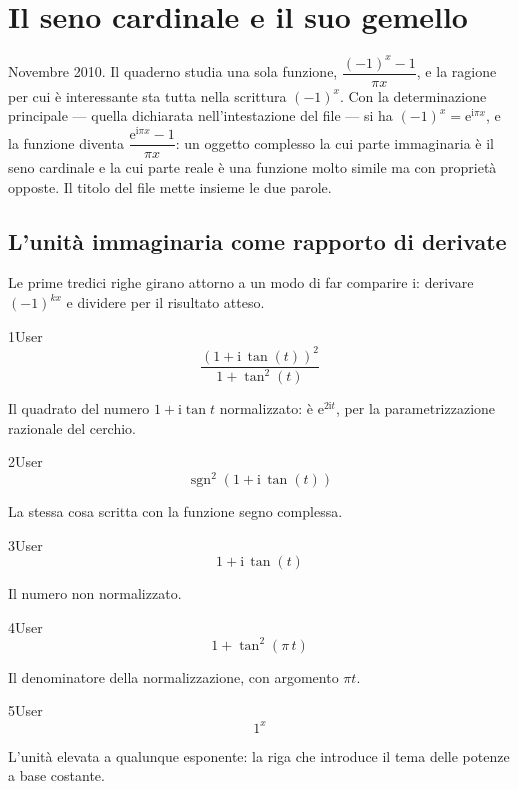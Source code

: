 \chapter{Il seno cardinale e il suo gemello}
\label{cap:cosinc}

Novembre 2010. Il quaderno studia una sola funzione, $\dfrac{(-1)^x-1}{\pi x}$, e la ragione per cui è interessante sta tutta nella scrittura $(-1)^x$. Con la determinazione principale — quella dichiarata nell'intestazione del file — si ha $(-1)^x=\mathrm{e}^{\mathrm{i}\pi x}$, e la funzione diventa $\dfrac{\mathrm{e}^{\mathrm{i}\pi x}-1}{\pi x}$: un oggetto complesso la cui parte immaginaria è il seno cardinale e la cui parte reale è una funzione molto simile ma con proprietà opposte. Il titolo del file mette insieme le due parole.

\section{L'unità immaginaria come rapporto di derivate}

Le prime tredici righe girano attorno a un modo di far comparire $\mathrm{i}$: derivare $(-1)^{kx}$ e dividere per il risultato atteso.

\begin{espr}{1}{User}{}
\[
\frac{\left(1 + \mathrm{i}\, \tan\!\left(t\right)\right)^{2}}{1 + \tan^{2}\!\left(t\right)}
\]
\end{espr}
Il quadrato del numero $1+\mathrm{i}\tan t$ normalizzato: è $\mathrm{e}^{2\mathrm{i}t}$, per la parametrizzazione razionale del cerchio.

\begin{espr}{2}{User}{}
\[
\operatorname{sgn}^{2}\!\left(1 + \mathrm{i}\, \tan\!\left(t\right)\right)
\]
\end{espr}
La stessa cosa scritta con la funzione segno complessa.

\begin{espr}{3}{User}{}
\[
1 + \mathrm{i}\, \tan\!\left(t\right)
\]
\end{espr}
Il numero non normalizzato.

\begin{espr}{4}{User}{}
\[
1 + \tan^{2}\!\left(\pi\, t\right)
\]
\end{espr}
Il denominatore della normalizzazione, con argomento $\pi t$.

\begin{espr}{5}{User}{}
\[
1^{x}
\]
\end{espr}
L'unità elevata a qualunque esponente: la riga che introduce il tema delle potenze a base costante.

